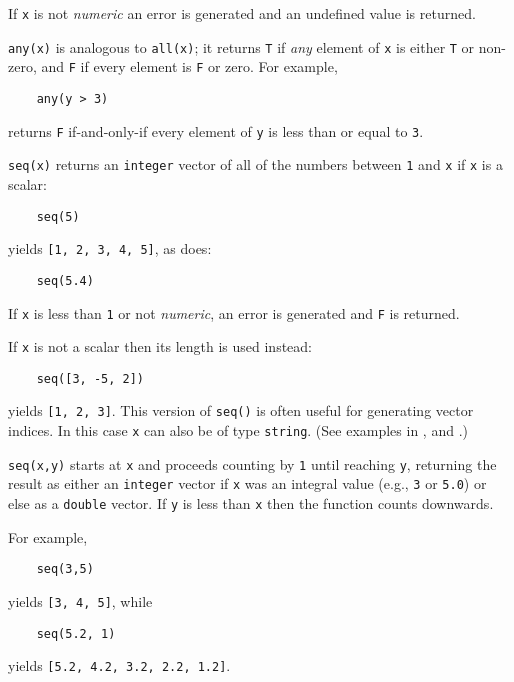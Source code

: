 \begin{sloppy}
\begin{list}{}{}
If {\tt x} is not {\em numeric\/} 
an error is generated and
an undefined value is returned.

\item[{\tt any(x)}] \label{any-func} 
is analogous to {\tt all(x)}; it returns {\tt T}
if {\em any} element of {\tt x} is either {\tt T} or non-zero, and
{\tt F} if every element is {\tt F} or zero.  For example,
\begin{verbatim}
    any(y > 3)
\end{verbatim}
returns {\tt F} if-and-only-if every element of {\tt y} is less than or
equal to {\tt 3}.

\item[{\tt seq(x)}] \label{seq1-func}
returns an {\tt integer} vector of all of the numbers
between {\tt 1} and {\tt x} if {\tt x} is a scalar:
\begin{verbatim}
    seq(5)
\end{verbatim}
yields {\tt [1, 2, 3, 4, 5]}, as does:
\begin{verbatim}
    seq(5.4)
\end{verbatim}
If {\tt x} is less than {\tt 1} or not {\em numeric\/}, an error is
generated and {\tt F} is returned.

If {\tt x} is not a scalar then its length is used instead:
\begin{verbatim}
    seq([3, -5, 2])
\end{verbatim}
yields {\tt [1, 2, 3]}.
This version of {\tt seq()} is often useful
for generating vector indices. In this case {\tt x} can also be of
type {\tt string}. 
(See examples in , and .)

\item[{\tt seq(x,y)}] \label{seq2-func}
starts at {\tt x} and proceeds counting by {\tt 1}
until reaching {\tt y}, returning the result as either an {\tt integer}
vector if {\tt x} was an integral value (e.g., {\tt 3} or {\tt 5.0}) or else
as a {\tt double} vector.  If {\tt y} is less than {\tt x} then the
function counts downwards.

For example,
\begin{verbatim}
    seq(3,5)
\end{verbatim}
yields {\tt [3, 4, 5]}, while
\begin{verbatim}
    seq(5.2, 1)
\end{verbatim}
yields {\tt [5.2, 4.2, 3.2, 2.2, 1.2]}.


\end{list}
\end{sloppy}
